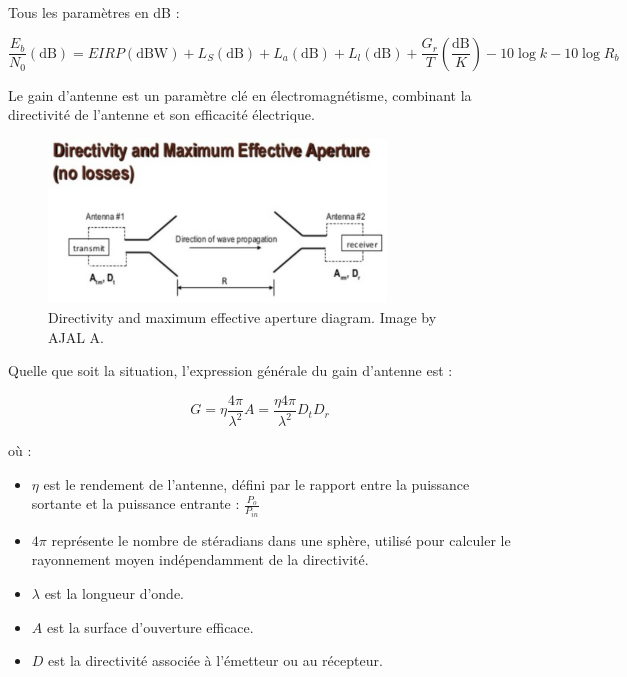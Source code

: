 Tous les paramètres en dB :

\begin{equation}
    \frac{E_b}{N_0} (\text{dB}) = EIRP (\text{dBW}) + L_S (\text{dB}) + L_a (\text{dB}) + L_l (\text{dB}) + \frac{G_r}{T} \left(\frac{\text{dB}}{K}\right) - 10 \log k - 10 \log R_b
\end{equation}

Le gain d'antenne est un paramètre clé en électromagnétisme, combinant la directivité de l'antenne et son efficacité électrique.

\begin{figure}[H] %
    \centering
    \includegraphics[width=0.8\textwidth]{figures/6-51.jpg}
    
    \caption{Directivity and maximum effective aperture diagram. Image by AJAL A.}
    \label{fig:communication2}
\end{figure}


Quelle que soit la situation, l'expression générale du gain d'antenne est :

\begin{equation}
    G = \eta \frac{4 \pi}{\lambda^2} A = \frac{\eta 4 \pi}{\lambda^2} D_t D_r
\end{equation}

où :

\begin{itemize}
    \item $\eta$ est le rendement de l'antenne, défini par le rapport entre la puissance sortante et la puissance entrante : $\frac{P_o}{P_{in}}$
    \item $4 \pi$ représente le nombre de stéradians dans une sphère, utilisé pour calculer le rayonnement moyen indépendamment de la directivité.
    \item $\lambda$ est la longueur d'onde.
    \item $A$ est la surface d'ouverture efficace.
    \item $D$ est la directivité associée à l’émetteur ou au récepteur.
\end{itemize}

